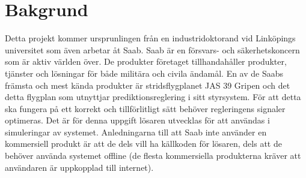 \section{Bakgrund}    
Detta projekt kommer ursprunlingen från en industridoktorand vid Linköpings universitet som även arbetar åt Saab. Saab är en försvars- och säkerhetskoncern som är aktiv världen över. De produkter företaget tillhandahåller produkter, tjänster och lösningar för både militära och civila ändamål. \citep{saabbrief}
\newline
\newline
En av de Saabs främsta och mest kända produkter är stridsflygplanet JAS 39 Gripen och det detta flygplan som utnyttjar prediktionsreglering i sitt styrsystem. För att detta ska fungera på ett korrekt och tillförlitligt sätt behöver regleringens signaler optimeras. Det är för denna uppgift lösaren utvecklas för att användas i simuleringar av systemet. 
\newline
\newline
Anledningarna till att Saab inte använder en kommersiell produkt är att de dels vill ha källkoden för lösaren, dels att de behöver använda systemet offline (de flesta kommersiella produkterna kräver att användaren är uppkopplad till internet).  